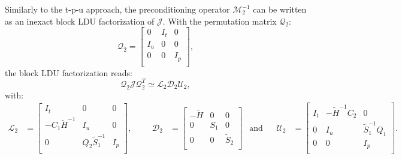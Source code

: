 \documentclass[3p,times]{elsarticle}
\theoremstyle{plain}
\newcommand{\Mat}[1]{#1}
\newcommand{\tS}{\widetilde{S}}
\newcommand{\tH}{\widetilde{H}}
\begin{document}
Similarly to the t-p-u approach, the preconditioning operator $\mathcal{M}_2^{-1}$ can be written as an inexact block LDU factorization of $\mathcal{J}$. With
the permutation matrix $\mathcal{Q}_2$:
\begin{equation}
  \mathcal{Q}_2 = \begin{bmatrix}
    \Mat{0} & \Mat{I}_t & \Mat{0} \\
    \Mat{I}_u & \Mat{0} & \Mat{0} \\
    \Mat{0} & \Mat{0} & \Mat{I}_p \\
  \end{bmatrix},
  \label{eq:Q2}
\end{equation}
the block LDU factorization reads:
\begin{equation}
  \mathcal{Q}_2 \mathcal{J} \mathcal{Q}_2^T \simeq \mathcal{L}_2 \mathcal{D}_2 \mathcal{U}_2,
\end{equation}
with:
\begin{align}
  \mathcal{L}_2 &= \begin{bmatrix}
    \Mat{I}_t & \Mat{0} & \Mat{0} \\
    -\Mat{C}_1\Mat{\tH}^{-1} & \Mat{I}_u & \Mat{0} \\
    \Mat{0} & \Mat{Q}_2\Mat{\tS}_1^{-1} & \Mat{I}_p \\
  \end{bmatrix}, &&&
  \mathcal{D}_2 &= \begin{bmatrix}
    -\Mat{\tH} & \Mat{0} & \Mat{0} \\
    \Mat{0} & \Mat{S}_1 & \Mat{0} \\
    \Mat{0} & \Mat{0} & \Mat{\tS}_2 \\
  \end{bmatrix} & \text{and} &&
  \mathcal{U}_2 &= \begin{bmatrix}
    \Mat{I}_t & -\Mat{\tH}^{-1}\Mat{C}_2 & \Mat{0} \\
    \Mat{0} & \Mat{I}_u & \Mat{\tS}_1^{-1}\Mat{Q}_1 \\
    \Mat{0} & \Mat{0} & \Mat{I}_p \\
  \end{bmatrix}.
  \label{eq:LDU2}
\end{align}
\end{document}
